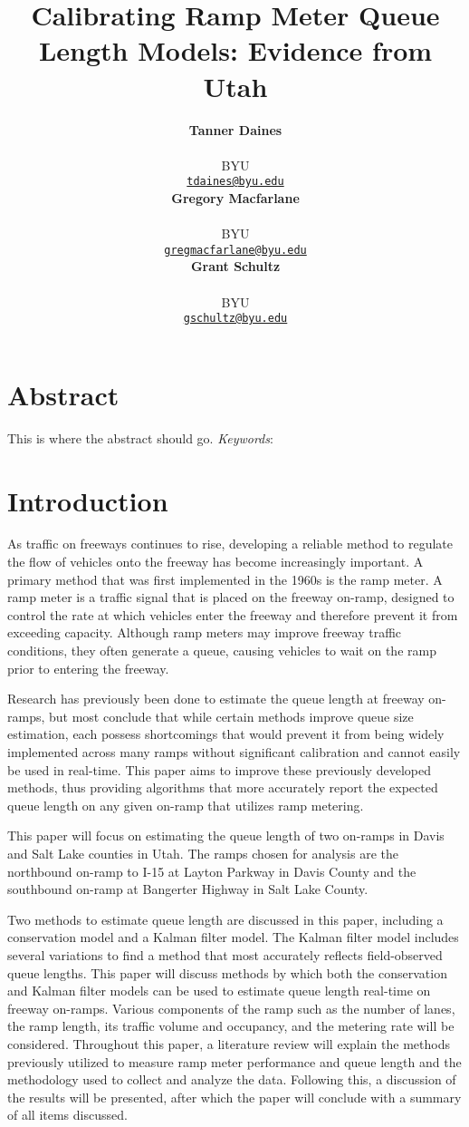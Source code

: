 \documentclass[numbered]{trbarticle}
\title{Calibrating Ramp Meter Queue Length Models: Evidence from Utah}
\author{%
    \textbf{Tanner Daines}\\
  \textit{}
  \\
  BYU\\
  \href{mailto:tdaines@byu.edu}{\nolinkurl{tdaines@byu.edu}}\\
  \hfill\break
    \textbf{Gregory Macfarlane}\\
  \textit{}
  \\
  BYU\\
  \href{mailto:gregmacfarlane@byu.edu}{\nolinkurl{gregmacfarlane@byu.edu}}\\
  \hfill\break
    \textbf{Grant Schultz}\\
  \textit{}
  \\
  BYU\\
  \href{mailto:gschultz@byu.edu}{\nolinkurl{gschultz@byu.edu}}\\
  \hfill\break
  }
\begin{document}
\maketitle


\section{Abstract}
This is where the abstract should go.
\hfill\break%
\hfill\break%
\noindent\textit{Keywords}: 
\newpage

\hypertarget{intro}{%
\section{Introduction}\label{intro}}

As traffic on freeways continues to rise, developing a reliable method to regulate the flow of vehicles onto the freeway has become increasingly important. A primary method that was first implemented in the 1960s is the ramp meter. A ramp meter is a traffic signal that is placed on the freeway on-ramp, designed to control the rate at which vehicles enter the freeway and therefore prevent it from exceeding capacity. Although ramp meters may improve freeway traffic conditions, they often generate a queue, causing vehicles to wait on the ramp prior to entering the freeway.

Research has previously been done to estimate the queue length at freeway on-ramps, but most conclude that while certain methods improve queue size estimation, each possess shortcomings that would prevent it from being widely implemented across many ramps without significant calibration and cannot easily be used in real-time. This paper aims to improve these previously developed methods, thus providing algorithms that more accurately report the expected queue length on any given on-ramp that utilizes ramp metering.

This paper will focus on estimating the queue length of two on-ramps in Davis and Salt Lake counties in Utah. The ramps chosen for analysis are the northbound on-ramp to I-15 at Layton Parkway in Davis County and the southbound on-ramp at Bangerter Highway in Salt Lake County.

Two methods to estimate queue length are discussed in this paper, including a conservation model and a Kalman filter model. The Kalman filter model includes several variations to find a method that most accurately reflects field-observed queue lengths. This paper will discuss methods by which both the conservation and Kalman filter models can be used to estimate queue length real-time on freeway on-ramps. Various components of the ramp such as the number of lanes, the ramp length, its traffic volume and occupancy, and the metering rate will be considered. Throughout this paper, a literature review will explain the methods previously utilized to measure ramp meter performance and queue length and the methodology used to collect and analyze the data. Following this, a discussion of the results will be presented, after which the paper will conclude with a summary of all items discussed.
\end{document}
